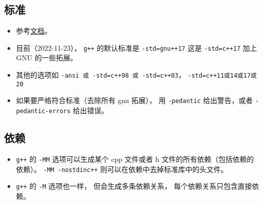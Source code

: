 \subsection{标准}
\begin{itemize}
\item 参考\href{https://gcc.gnu.org/onlinedocs/gcc/Standards.html}{文档}。
\item 目前（2022-11-23）， \verb|g++| 的默认标准是 \verb|-std=gnu++17| 这是 \verb|-std=c++17| 加上 GNU 的一些拓展。
\item 其他的选项如 \verb|-ansi 或 -std=c++98 或 -std=c++03|， \verb|-std=c++11或14或17或20|
\item 如果要严格符合标准（去除所有 gnu 拓展）， 用 \verb|-pedantic| 给出警告，或者 \verb|-pedantic-errors| 给出错误。
\end{itemize}

\subsection{依赖}
\begin{itemize}
\item \verb|g++| 的 \verb|-MM| 选项可以生成某个 cpp 文件或者 h 文件的所有依赖（包括依赖的依赖）。 \verb|-MM -nostdinc++| 则可以在依赖中去掉标准库中的头文件。
\item \verb|g++| 的 \verb|-M| 选项也一样， 但会生成多条依赖关系， 每个依赖关系只包含直接依赖。
\end{itemize}
